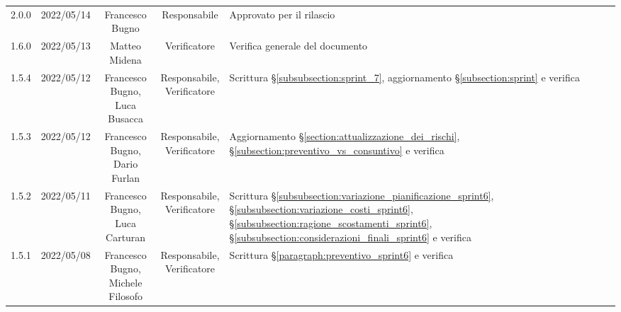 \begin{center}
\begin{longtable}[c]{c | c | c | c | p{5cm}}
		2.0.0                                                      & 2022/05/14 & Francesco Bugno                        & Responsabile   & Approvato per il rilascio                                                                                                                 \\
		1.6.0                                                      & 2022/05/13 & Matteo Midena                          & Verificatore   & Verifica generale del documento                                                                                                           \\
		1.5.4                                                      & 2022/05/12 & \Shortunderstack{Francesco Bugno,                                                                                                                                                                   \\Luca Busacca} & \Shortunderstack{Responsabile,\\Verificatore} & Scrittura §\ref{subsubsection:sprint_7}, aggiornamento §\ref{subsection:sprint} e verifica\\
		1.5.3                                                      & 2022/05/12 & \Shortunderstack{Francesco Bugno,                                                                                                                                                                   \\Dario Furlan} & \Shortunderstack{Responsabile,\\Verificatore} & Aggiornamento §\ref{section:attualizzazione_dei_rischi}, §\ref{subsection:preventivo_vs_consuntivo} e verifica\\
		1.5.2                                                      & 2022/05/11 & \Shortunderstack{Francesco Bugno,                                                                                                                                                                   \\Luca Carturan} & \Shortunderstack{Responsabile,\\Verificatore} & Scrittura §\ref{subsubsection:variazione_pianificazione_sprint6}, §\ref{subsubsection:variazione_costi_sprint6}, §\ref{subsubsection:ragione_scostamenti_sprint6}, §\ref{subsubsection:considerazioni_finali_sprint6} e verifica\\
		1.5.1                                                      & 2022/05/08 & \Shortunderstack{Francesco Bugno,                                                                                                                                                                   \\Michele Filosofo} & \Shortunderstack{Responsabile,\\Verificatore} & Scrittura §\ref{paragraph:preventivo_sprint6} e verifica\\

\end{longtable}
\end{center}
